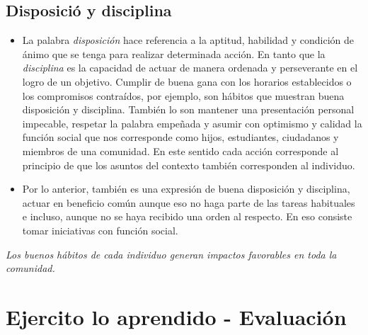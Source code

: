 \documentclass[10pt,twoside]{article}
\begin{document}
\subsection*{Disposici\'{o} y disciplina}
\begin{itemize}
\item La palabra \emph{disposición} hace referencia a la aptitud,
habilidad y condición de ánimo que se tenga para
realizar determinada acción. En tanto que la \emph{disciplina}
es la capacidad de actuar de manera ordenada y
perseverante en el logro de un objetivo. Cumplir
de buena gana con los horarios establecidos o
los compromisos contraídos, por ejemplo, son
hábitos que muestran buena disposición y
disciplina. También lo son mantener una
presentación personal impecable, respetar
la palabra empeñada y asumir con
optimismo y calidad la función social que
nos corresponde como hijos, estudiantes,
ciudadanos y miembros de una comunidad.
En este sentido cada acción corresponde al
principio de que los asuntos del contexto
también corresponden al individuo.
\item Por lo anterior, también es una
expresión de buena disposición
y disciplina, actuar en beneficio
común aunque eso no haga
parte de las tareas habituales
e incluso, aunque no se haya
recibido una orden al respecto.
En eso consiste tomar iniciativas
con función social.
\end{itemize}
\emph{Los buenos hábitos de cada individuo
generan impactos favorables en toda la
comunidad. }
\section*{Ejercito lo aprendido - Evaluaci\'{o}n}
\end{document}

